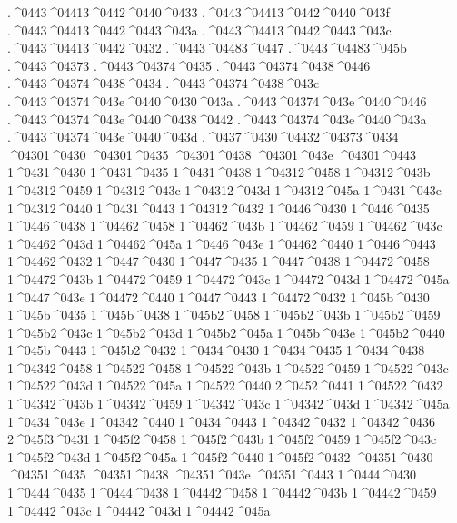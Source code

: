 {.^^^^0443^^^^04413^^^^0442^^^^0440^^^^0433
.^^^^0443^^^^04413^^^^0442^^^^0440^^^^043f
.^^^^0443^^^^04413^^^^0442^^^^0443^^^^043a
.^^^^0443^^^^04413^^^^0442^^^^0443^^^^043c
.^^^^0443^^^^04413^^^^0442^^^^0432
.^^^^0443^^^^04483^^^^0447
.^^^^0443^^^^04483^^^^045b
.^^^^0443^^^^04373
.^^^^0443^^^^04374^^^^0435
.^^^^0443^^^^04374^^^^0438^^^^0446
.^^^^0443^^^^04374^^^^0438^^^^0434
.^^^^0443^^^^04374^^^^0438^^^^043c
.^^^^0443^^^^04374^^^^043e^^^^0440^^^^0430^^^^043a
.^^^^0443^^^^04374^^^^043e^^^^0440^^^^0446
.^^^^0443^^^^04374^^^^043e^^^^0440^^^^0438^^^^0442
.^^^^0443^^^^04374^^^^043e^^^^0440^^^^043a
.^^^^0443^^^^04374^^^^043e^^^^0440^^^^043d
.^^^^0437^^^^0430^^^^04432^^^^04373^^^^0434
^^^^04301^^^^0430
^^^^04301^^^^0435
^^^^04301^^^^0438
^^^^04301^^^^043e
^^^^04301^^^^0443
1^^^^0431^^^^0430
1^^^^0431^^^^0435
1^^^^0431^^^^0438
1^^^^04312^^^^0458
1^^^^04312^^^^043b
1^^^^04312^^^^0459
1^^^^04312^^^^043c
1^^^^04312^^^^043d
1^^^^04312^^^^045a
1^^^^0431^^^^043e
1^^^^04312^^^^0440
1^^^^0431^^^^0443
1^^^^04312^^^^0432
1^^^^0446^^^^0430
1^^^^0446^^^^0435
1^^^^0446^^^^0438
1^^^^04462^^^^0458
1^^^^04462^^^^043b
1^^^^04462^^^^0459
1^^^^04462^^^^043c
1^^^^04462^^^^043d
1^^^^04462^^^^045a
1^^^^0446^^^^043e
1^^^^04462^^^^0440
1^^^^0446^^^^0443
1^^^^04462^^^^0432
1^^^^0447^^^^0430
1^^^^0447^^^^0435
1^^^^0447^^^^0438
1^^^^04472^^^^0458
1^^^^04472^^^^043b
1^^^^04472^^^^0459
1^^^^04472^^^^043c
1^^^^04472^^^^043d
1^^^^04472^^^^045a
1^^^^0447^^^^043e
1^^^^04472^^^^0440
1^^^^0447^^^^0443
1^^^^04472^^^^0432
1^^^^045b^^^^0430
1^^^^045b^^^^0435
1^^^^045b^^^^0438
1^^^^045b2^^^^0458
1^^^^045b2^^^^043b
1^^^^045b2^^^^0459
1^^^^045b2^^^^043c
1^^^^045b2^^^^043d
1^^^^045b2^^^^045a
1^^^^045b^^^^043e
1^^^^045b2^^^^0440
1^^^^045b^^^^0443
1^^^^045b2^^^^0432
1^^^^0434^^^^0430
1^^^^0434^^^^0435
1^^^^0434^^^^0438
1^^^^04342^^^^0458
1^^^^04522^^^^0458
1^^^^04522^^^^043b
1^^^^04522^^^^0459
1^^^^04522^^^^043c
1^^^^04522^^^^043d
1^^^^04522^^^^045a
1^^^^04522^^^^0440
2^^^^0452^^^^0441
1^^^^04522^^^^0432
1^^^^04342^^^^043b
1^^^^04342^^^^0459
1^^^^04342^^^^043c
1^^^^04342^^^^043d
1^^^^04342^^^^045a
1^^^^0434^^^^043e
1^^^^04342^^^^0440
1^^^^0434^^^^0443
1^^^^04342^^^^0432
1^^^^04342^^^^0436
2^^^^045f3^^^^0431
1^^^^045f2^^^^0458
1^^^^045f2^^^^043b
1^^^^045f2^^^^0459
1^^^^045f2^^^^043c
1^^^^045f2^^^^043d
1^^^^045f2^^^^045a
1^^^^045f2^^^^0440
1^^^^045f2^^^^0432
^^^^04351^^^^0430
^^^^04351^^^^0435
^^^^04351^^^^0438
^^^^04351^^^^043e
^^^^04351^^^^0443
1^^^^0444^^^^0430
1^^^^0444^^^^0435
1^^^^0444^^^^0438
1^^^^04442^^^^0458
1^^^^04442^^^^043b
1^^^^04442^^^^0459
1^^^^04442^^^^043c
1^^^^04442^^^^043d
1^^^^04442^^^^045a
}
